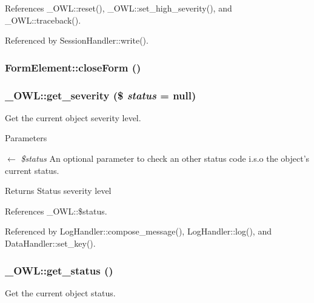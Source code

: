 References \_\-OWL::reset(), \_\-OWL::set\_\-high\_\-severity(), and \_\-OWL::traceback().



Referenced by SessionHandler::write().

\subsubsection[{closeForm}]{\setlength{\rightskip}{0pt plus 5cm}FormElement::closeForm ()}\label{classFormElement_a14feba74af80db37e927d740d4b82a76}
\subsubsection[{get\_\-severity}]{\setlength{\rightskip}{0pt plus 5cm}\_\-OWL::get\_\-severity (\$ {\em status} = {\ttfamily null})}\label{class__OWL_adf9509ef96858be7bdd9414c5ef129aa}
Get the current object severity level.


\begin{DoxyParams}{Parameters}
\item[\mbox{$\leftarrow$} {\em \$status}]An optional parameter to check an other status code i.s.o the object's current status. \end{DoxyParams}
\begin{DoxyReturn}{Returns}
Status severity level 
\end{DoxyReturn}


References \_\-OWL::\$status.



Referenced by LogHandler::compose\_\-message(), LogHandler::log(), and DataHandler::set\_\-key().

\subsubsection[{get\_\-status}]{\setlength{\rightskip}{0pt plus 5cm}\_\-OWL::get\_\-status ()}\label{class__OWL_a99ec771fa2c5c279f80152cc09e489a8}
Get the current object status.


